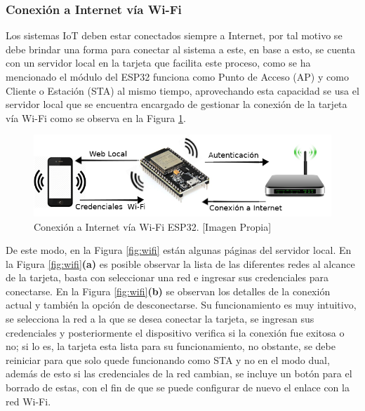 \subsubsection{Conexión a Internet vía Wi-Fi}

Los sistemas IoT deben estar conectados siempre a Internet, por tal motivo se debe brindar una forma para conectar al sistema a este, en base a esto, se cuenta con un servidor local en la tarjeta que facilita este proceso, como se ha mencionado el módulo del ESP32 funciona como Punto de Acceso (AP) y como Cliente o Estación (STA) al mismo tiempo, aprovechando esta capacidad se usa el servidor local que se encuentra encargado de gestionar la conexión de la tarjeta vía Wi-Fi como se observa en la Figura \ref{fig:conexion}.\\

\begin{figure}[H]
	\centering
	\caption[Conexión a Internet vía Wi-Fi ESP32.]{Conexión a Internet vía Wi-Fi ESP32.  [Imagen Propia]}
	\label{fig:conexion}
	\includegraphics[width=0.9\linewidth]{Imagenes/conexion}
\end{figure}

De este modo, en la Figura \ref{fig:wifi} están algunas páginas del servidor local. En la Figura \ref{fig:wifi}\textbf{(a)} es posible observar la lista de las diferentes redes al alcance de la tarjeta, basta con seleccionar una red e ingresar sus credenciales para conectarse. En la Figura \ref{fig:wifi}\textbf{(b)} se observan los detalles de la conexión actual y también la opción de desconectarse. Su funcionamiento es muy intuitivo, se selecciona la red a la que se desea conectar la tarjeta, se ingresan sus credenciales y posteriormente el dispositivo verifica si la conexión fue exitosa o no; si lo es, la tarjeta esta lista para su funcionamiento, no obstante, se debe reiniciar para que solo quede funcionando como STA y no en el modo dual, además de esto si las credenciales de la red cambian, se incluye un botón para el borrado de estas, con el fin de que se puede configurar de nuevo el enlace con la red Wi-Fi.

